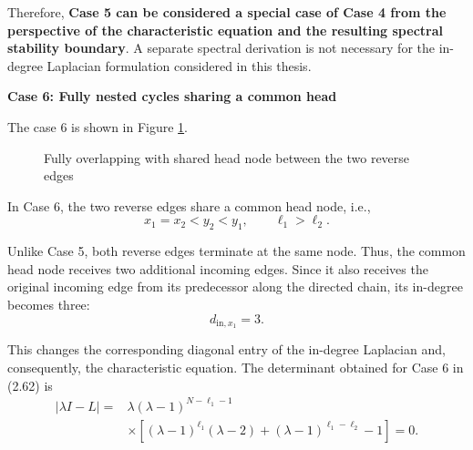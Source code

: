 \documentclass[11pt,a4paper]{article}
\begin{document}
Therefore, \textbf{Case 5 can be considered a special case of Case 4 from the perspective of the characteristic equation and the resulting spectral stability boundary}. A separate spectral derivation is not necessary for the in-degree Laplacian formulation considered in this thesis.

\medskip
\noindent
\textbf{Case 6: Fully nested cycles sharing a common head}

The case 6 is shown in Figure \ref{Case6}.

\begin{figure}[H]
		\centering
		\caption{Fully overlapping with shared head node between the two reverse edges}
		\label{Case6}
	\end{figure}

In Case 6, the two reverse edges share a common head node, i.e.,
\begin{equation}
    x_1 = x_2 < y_2 < y_1,
    \qquad \ell_1 > \ell_2.
\end{equation}

Unlike Case 5, both reverse edges terminate at the same node. Thus, the common head node receives two additional incoming edges. Since it also receives the original incoming edge from its predecessor along the directed chain, its in-degree becomes three:
\begin{equation}
    d_{\mathrm{in},x_1}=3.
\end{equation}

This changes the corresponding diagonal entry of the in-degree Laplacian and, consequently, the characteristic equation. The determinant obtained for Case 6 in (2.62) is
\begin{equation}
\begin{aligned}
    |\lambda I-L|
    ={}&\lambda(\lambda-1)^{N-\ell_1-1}\\
    &\times\left[
    (\lambda-1)^{\ell_1}(\lambda-2)
    +(\lambda-1)^{\ell_1-\ell_2}-1
    \right]=0.
\end{aligned}
\tag{2.62}
\end{equation}
\end{document}
